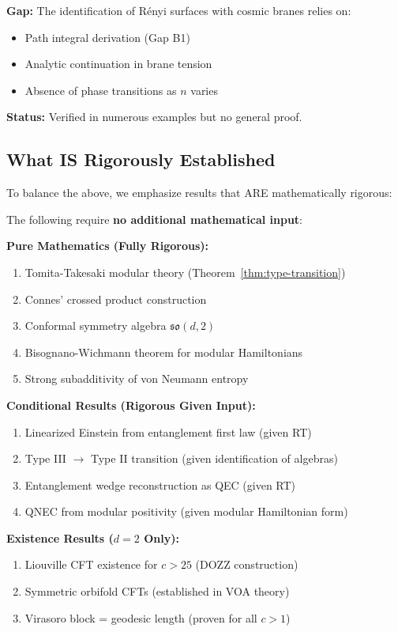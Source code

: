 \documentclass[12pt,a4paper]{article}
\begin{document}
\begin{gapbox}[title={Gap C3: Cosmic Brane Prescription (Theorem~\ref{thm:spectral-reconstruction})}]
\textbf{Gap:} The identification of R\'enyi surfaces with cosmic branes relies on:
\begin{itemize}
    \item Path integral derivation (Gap B1)
    \item Analytic continuation in brane tension
    \item Absence of phase transitions as $n$ varies
\end{itemize}

\textbf{Status:} Verified in numerous examples but no general proof.
\end{gapbox}

\subsection{What IS Rigorously Established}

To balance the above, we emphasize results that ARE mathematically rigorous:

\begin{rigorbox}[title={Rigorous Results}]
The following require \textbf{no additional mathematical input}:

\textbf{Pure Mathematics (Fully Rigorous):}
\begin{enumerate}
    \item Tomita-Takesaki modular theory (Theorem~\ref{thm:type-transition})
    \item Connes' crossed product construction
    \item Conformal symmetry algebra $\mathfrak{so}(d,2)$
    \item Bisognano-Wichmann theorem for modular Hamiltonians
    \item Strong subadditivity of von Neumann entropy
\end{enumerate}

\textbf{Conditional Results (Rigorous Given Input):}
\begin{enumerate}
    \item Linearized Einstein from entanglement first law (given RT)
    \item Type III $\to$ Type II transition (given identification of algebras)
    \item Entanglement wedge reconstruction as QEC (given RT)
    \item QNEC from modular positivity (given modular Hamiltonian form)
\end{enumerate}

\textbf{Existence Results ($d=2$ Only):}
\begin{enumerate}
    \item Liouville CFT existence for $c > 25$ (DOZZ construction)
    \item Symmetric orbifold CFTs (established in VOA theory)
    \item Virasoro block = geodesic length (proven for all $c > 1$)
\end{enumerate}
\end{rigorbox}
\end{document}
